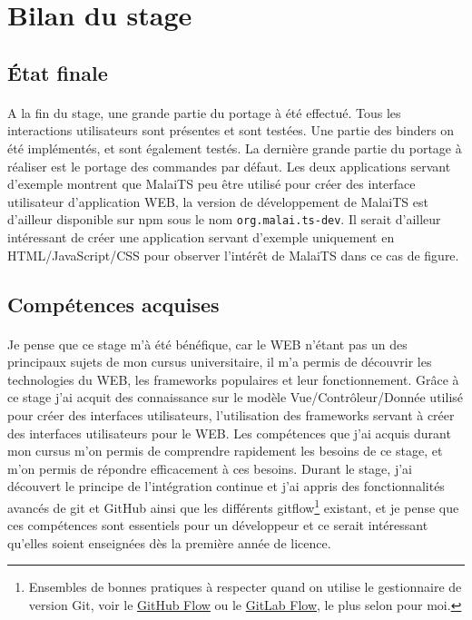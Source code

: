 \documentclass[11pt, a4paper, pdftex]{article}
\newcommand{\info}{\texttt}
\begin{document}
    \newpage
    \section{Bilan du stage}\label{sec:bilsta}
        \subsection{État finale}\label{subsec:etatfin}
            \paragraph{}
                A la fin du stage, une grande partie du portage à été effectué.
                Tous les interactions utilisateurs sont présentes et sont testées.
                Une partie des binders on été implémentés, et sont également testés.
                La dernière grande partie du portage à réaliser est le portage des commandes par défaut.
                Les deux applications servant d'exemple montrent que MalaiTS peu être utilisé pour créer des interface utilisateur d'application WEB, la version de développement de MalaiTS est d'ailleur disponible sur npm sous le nom \info{org.malai.ts-dev}.
                Il serait d'ailleur intéressant de créer une application servant d'exemple uniquement en HTML/JavaScript/CSS pour observer l'intérêt de MalaiTS dans ce cas de figure.

        \subsection{Compétences acquises}\label{subsec:compacq}
            \paragraph{}
                Je pense que ce stage m'à été bénéfique, car le WEB n'étant pas un des principaux sujets de mon cursus universitaire, il m'a permis de découvrir les technologies du WEB, les frameworks populaires et leur fonctionnement.
                Grâce à ce stage j'ai acquit des connaissance sur le modèle Vue/Contrôleur/Donnée utilisé pour créer des interfaces utilisateurs, l'utilisation des frameworks servant à créer des interfaces utilisateurs pour le WEB\@.
                Les compétences que j'ai acquis durant mon cursus m'on permis de comprendre rapidement les besoins de ce stage, et m'on permis de répondre efficacement à ces besoins.
                Durant le stage, j'ai découvert le principe de l'intégration continue et j'ai appris des fonctionnalités avancés de git et GitHub ainsi que les différents gitflow\footnote{Ensembles de bonnes pratiques à respecter quand on utilise le gestionnaire de version Git, voir le \href{https://guides.github.com/introduction/flow/}{GitHub Flow} ou le \href{https://about.gitlab.com/2014/09/29/gitlab-flow/}{GitLab Flow}, le plus selon pour moi.} existant,
                et je pense que ces compétences sont essentiels pour un développeur et ce serait intéressant qu'elles soient enseignées dès la première année de licence.
\end{document}
